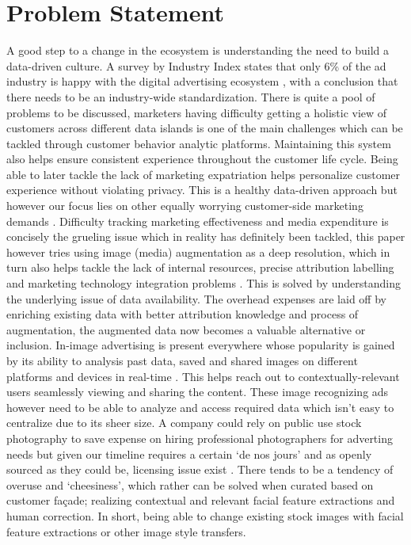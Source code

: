 \documentclass[preprint,12pt]{elsarticle}
\begin{document}
\section{Problem Statement}
\label{S:3}
A good step to a change in the ecosystem is understanding the need to build a data-driven culture. A survey by Industry Index states that only 6\% of the ad industry is happy with the digital advertising ecosystem \cite{MCH2020}, with a conclusion that there needs to be an industry-wide standardization. There is quite a pool of problems to be discussed, marketers having difficulty getting a holistic view of customers across different data islands is one of the main challenges which can be tackled through customer behavior analytic platforms. Maintaining this system also helps ensure consistent experience throughout the customer life cycle. Being able to later tackle the lack of marketing expatriation helps personalize customer experience without violating privacy. This is a healthy data-driven approach but however our focus lies on other equally worrying customer-side marketing demands \cite{Mich2019dda}.
Difficulty tracking marketing effectiveness and media expenditure is concisely the grueling issue which in reality has definitely been tackled, this paper however tries using image (media) augmentation as a deep resolution, which in turn also helps tackle the lack of internal resources, precise attribution labelling and marketing technology integration problems \cite{Ross2019eMark}. This is solved by understanding the underlying issue of data availability. The overhead expenses are laid off by enriching existing data with better attribution knowledge and process of augmentation, the augmented data now becomes a valuable alternative or inclusion. 
In-image advertising is present everywhere whose popularity is gained by its ability to analysis past data, saved and shared images on different platforms and devices in real-time \cite{Steph2020advert}. This helps reach out to contextually-relevant users seamlessly viewing and sharing the content. These image recognizing ads however need to be able to analyze and access required data which isn't easy to centralize due to its sheer size. A company could rely on public use stock photography to save expense on hiring professional photographers for adverting needs but given our timeline requires a certain ‘de nos jours’ and as openly sourced as they could be, licensing issue exist \cite{Margot2019}. There tends to be a tendency of overuse and ‘cheesiness’, which rather can be solved when curated based on customer façade; realizing contextual and relevant facial feature extractions and human correction. In short, being able to change existing stock images with facial feature extractions or other image style transfers. 
\end{document}
